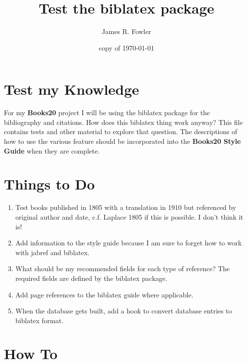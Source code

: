 \documentclass{article}
\begin{document}
\title{Test the {\ttfamily biblatex} package}
\author{James R. Fowler}
\date{copy of \today}
\maketitle


\section{Test my Knowledge}

For my {\bfseries Books20} project I will be using the {\ttfamily
  biblatex} \cite{Kime2019} package for the bibliography and citations.
How does this {\ttfamily biblatex} thing work anyway? This file
contains tests and other material to explore that question.  The
descriptions of how to use the various feature should be incorporated
into the {\bfseries Books20 Style Guide} when they are complete.


\section{Things to Do}

\begin{enumerate}
  \item Test books published in 1805 with a translation in 1910 but
    referenced by original author and date, c.f. Laplace 1805
    \cite{Laplace1805} if this is possible. I don't think it is!

  \item Add information to the style guide because I am sure to forget
    how to work with {\ttfamily jabref} and {\ttfamily biblatex}.

  \item What should be my recommended fields for each type of reference?
    The required fields are defined by the {\ttfamily biblatex} package.

  \item Add page references to the {\ttfamily biblatex} guide
    \cite{Kime2019} where applicable.
    
  \item When the database gets built, add a hook to convert database
    entries to {\ttfamily biblatex} format.

\end{enumerate}

\section{How To}
\end{document}
